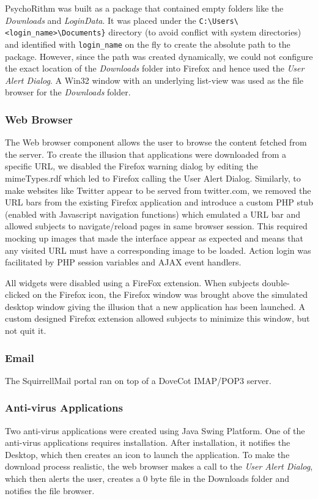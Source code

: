 PsychoRithm was built as a package that contained empty folders like the \textit{Downloads} and \textit{LoginData}. It was placed under the \verb|C:\Users\<login_name>\Documents}| directory (to avoid conflict with system directories) and identified with \verb|login_name| on the fly to create the absolute path to the package. However, since the path was created dynamically, we could not configure the exact location of the \textit{Downloads} folder into Firefox and hence used the \textit{User Alert Dialog}. A Win32 window with an underlying list-view was used as the file browser for the \textit{Downloads} folder.


\subsubsection{Web Browser}
The Web browser component allows the user to browse the content fetched from the server. To create the illusion that applications were downloaded from a specific URL, we disabled the Firefox warning dialog by editing the mimeTypes.rdf which led to Firefox calling the User Alert Dialog. Similarly, to make websites like Twitter appear to be served from twitter.com, we removed the URL bars from the existing Firefox application and introduce a custom PHP stub (enabled with Javascript navigation functions) which emulated a URL bar and allowed subjects to navigate/reload pages in same browser session. This required mocking up images that made the interface appear as expected and means that any visited URL must have a corresponding image to be loaded. Action login was facilitated by PHP session variables and AJAX event handlers.

All widgets were disabled using a FireFox extension. When subjects double-clicked on the Firefox icon, the Firefox window was brought above the simulated desktop window giving the illusion that a new application has been launched. A custom designed Firefox extension allowed subjects to minimize this window, but not quit it.

\subsubsection{Email}
The SquirrellMail portal ran on top of a DoveCot IMAP/POP3 server.

\subsubsection{Anti-virus Applications}
Two anti-virus applications were created using Java Swing Platform. One of the anti-virus applications requires installation. After installation, it notifies the Desktop, which then creates an icon
to launch the application. To make the download process realistic, the web browser makes a call
to the \textit{User Alert Dialog}, which then alerts the user, creates a 0 byte file in the Downloads folder
and notifies the file browser.

